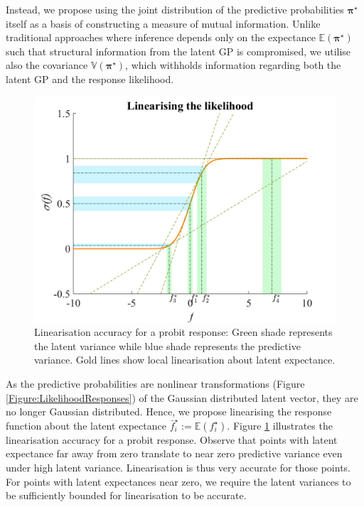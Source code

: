 \documentclass{article}
\renewcommand{\vec}[1]{\boldsymbol{#1}}
\begin{document}
		Instead, we propose using the joint distribution of the predictive probabilities $\vec{\pi^{\star}}$ itself as a basis of constructing a measure of mutual information. Unlike traditional approaches where inference depends only on the expectance $\mathbb{E}(\vec{\pi^{\star}})$ such that structural information from the latent GP is compromised, we utilise also the covariance $\mathbb{V}(\vec{\pi^{\star}})$, which withholds information regarding both the latent GP and the response likelihood.
	
		\begin{figure}[!htbp]
			\centering
				\includegraphics[width = \linewidth]{Figures/linearisation.png}
			\caption{Linearisation accuracy for a probit response: Green shade represents the latent variance while blue shade represents the predictive variance. Gold lines show local linearisation about latent expectance.}
			\label{Figure:Linearisation}
		\end{figure}
			
		As the predictive probabilities are nonlinear transformations (Figure \ref{Figure:LikelihoodResponses}) of the Gaussian distributed latent vector, they are no longer Gaussian distributed. Hence, we propose linearising the response function about the latent expectance $\bar{f}^{\star}_{i} := \mathbb{E}(f^{\star}_{i})$. Figure \ref{Figure:Linearisation} illustrates the linearisation accuracy for a probit response. Observe that points with latent expectance far away from zero translate to near zero predictive variance even under high latent variance. Linearisation is thus very accurate for those points. For points with latent expectances near zero, we require the latent variances to be sufficiently bounded for linearisation to be accurate.
\end{document}
